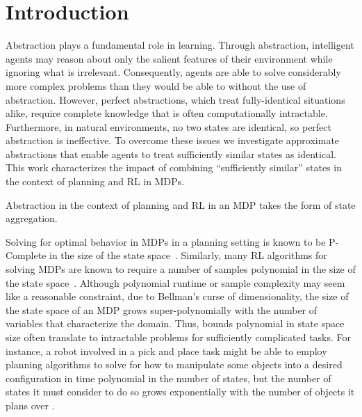 \section{Introduction}
Abstraction plays a fundamental role in learning. Through abstraction, intelligent agents may reason about only the salient features of their environment while ignoring what is irrelevant. Consequently, agents are able to solve considerably more complex problems than they would be able to without the use of abstraction. However, perfect abstractions, which treat fully-identical situations alike, require complete knowledge that is often computationally intractable. Furthermore, in natural environments, no two states are identical, so perfect abstraction is ineffective. To overcome these issues we investigate approximate abstractions that enable agents to treat sufficiently similar states as identical. This work characterizes the impact of combining ``sufficiently similar'' states in the context of planning and \ac{RL} in \acp{MDP}. 

Abstraction in the context of planning and \ac{RL} in an \ac{MDP} takes the form of state aggregation. 

Solving for optimal behavior in \acp{MDP} in a planning setting is known to be P-Complete in the size of the state space~\cite{papadimitriou1987complexity,littman1995complexity}. Similarly, many \ac{RL} algorithms for solving \acp{MDP} are known to require a number of samples polynomial in the size of the state space~\cite{strehl2009reinforcement}. Although polynomial runtime or sample complexity may seem like a reasonable constraint, due to Bellman's curse of dimensionality, the size of the state space of an \ac{MDP} grows super-polynomially with the number of variables that characterize the domain. Thus, bounds polynomial in state space size often translate to intractable problems for sufficiently complicated tasks.  For instance, a robot involved in a pick and place task might be able to employ planning algorithms to solve for how to manipulate some objects into a desired configuration in time polynomial in the number of states, but the number of states it must consider to do so grows exponentially with the number of objects it plans over .

